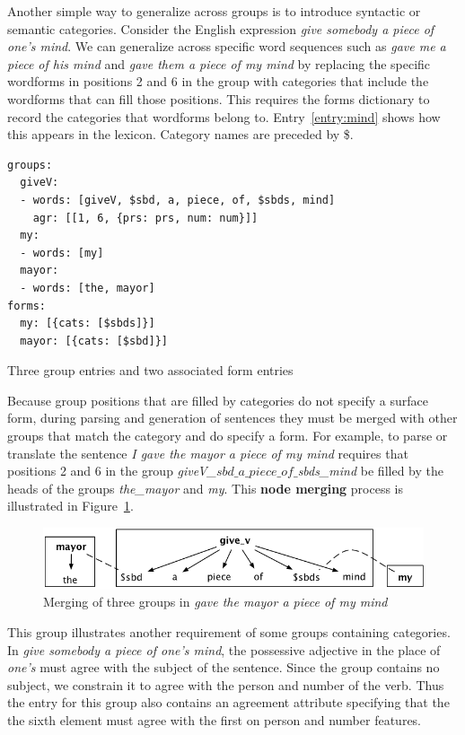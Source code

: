 \documentclass[11pt, a4paper]{article}
\begin{document}
Another simple way to generalize across groups is to introduce syntactic or semantic categories.
Consider the English expression \textit{give somebody a piece of one's mind}.
We can generalize across specific word sequences such as \textit{gave me a piece of his mind}
and \textit{gave them a piece of my mind} by replacing the specific wordforms in positions
2 and 6 in the group with categories that include the wordforms that can fill those positions.
This requires the forms dictionary to record the categories that wordforms belong to.
Entry~\ref{entry:mind} shows how this appears in the lexicon.
Category names are preceded by \$.

\begin{entry}
\small
\begin{verbatim}
groups:
  giveV:
  - words: [giveV, $sbd, a, piece, of, $sbds, mind]
    agr: [[1, 6, {prs: prs, num: num}]]
  my:
  - words: [my]
  mayor:
  - words: [the, mayor]
forms:
  my: [{cats: [$sbds]}]
  mayor: [{cats: [$sbd]}]
\end{verbatim}
\normalsize
\caption{Three group entries and two associated form entries}
\label{entry:mind}
\end{entry}

Because group positions that are filled by categories do not specify a surface form,
during parsing and generation of sentences they must be merged with other groups that match
the category and do specify a form.
For example, to parse or translate the sentence \textit{I gave the mayor a piece of my mind} requires
that positions 2 and 6 in the group \textit{giveV\_$sbd\_a\_piece\_of\_$sbds\_mind} be
filled by the heads of the groups \textit{the\_mayor} and \textit{my}.
This \textbf{node merging} process is illustrated in Figure~\ref{fig:mind}.

\begin{figure}[ht]
\begin{center}
  \includegraphics{mind}
\caption{Merging of three groups in \textit{gave the mayor a piece of my mind}}
\label{fig:mind}
\end{center}
\end{figure}

This group illustrates another requirement of some groups containing categories.
In \textit{give somebody a piece of one's mind}, the possessive adjective in the place of
\textit{one's} must agree with the subject of the sentence.
Since the group contains no subject, we constrain it to agree with the person and number
of the verb.
Thus the entry for this group also contains an agreement attribute specifying that
the the sixth element must agree with the first on person and number features.
\end{document}
